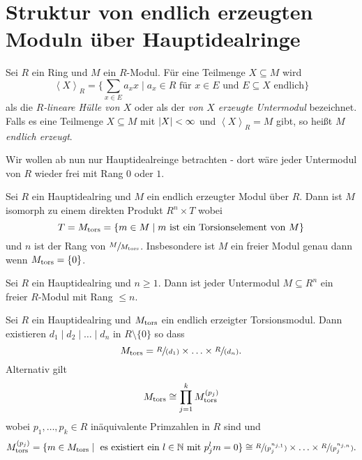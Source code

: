 \section{Struktur von endlich erzeugten Moduln über Hauptidealringe}

\begin{definition}
	Sei $R$ ein Ring und $M $ ein $R$-Modul.
	Für eine Teilmenge $X \subseteq M$ wird
	\[
	\left< X \right>_{R} = \{\sum_{x \in E} a_{x} x \mid a_{x} \in R \text{ für $x \in E$ und $E \subseteq X$ endlich}\} 
	\]
	als die \emph{$R$-lineare Hülle von $X$} oder als der \emph{von $X$ erzeugte Untermodul} bezeichnet.
	Falls es eine Teilmenge $X \subseteq M$ mit $\abs{X} < \infty$ und $\left< X \right>_{R} = M$ gibt, so heißt $M$ \emph{endlich erzeugt}.
\end{definition}


Wir wollen ab nun nur Hauptidealreinge betrachten - dort wäre jeder Untermodul von $R$ wieder frei mit Rang $0$ oder $1$.

\begin{theorem}
	Sei $R$ ein Hauptidealring und $M$ ein endlich erzeugter Modul über $R$.
	Dann ist $M$ isomorph zu einem direkten Produkt $R^{n} \times T$ wobei
	\[
		T = M_{\operatorname{tors}} = \{m \in M \mid m \text{ ist ein Torsionselement von } M\}
	\]
	und $n$ ist der Rang von $\sfrac{M}{M_{\operatorname{tors}}}$.
	Insbesondere ist $M$ ein freier Modul genau dann wenn $M_{\operatorname{tors}} = \{0\}$.
\end{theorem}

\begin{proposition}
	Sei $R$ ein Hauptidealring und $n \geq 1$. Dann ist jeder Untermodul $M \subseteq R^{n}$ ein freier $R$-Modul mit Rang $\leq n$.
\end{proposition}



\begin{theorem}
	Sei $R$ ein Hauptidealring und $M_{\operatorname{tors}}$ ein endlich erzeigter Torsionsmodul. 
	Dann existieren $d_1 \mid d_2 \mid \ldots \mid d_{n}$ in $R \setminus \{0\} $ so dass
	\[
		M_{\operatorname{tors}} = \sfrac{R}{(d_1)} \times \ldots \times \sfrac{R}{(d_{n})}
	.\] 
	Alternativ gilt
	\[
		M_{\operatorname{tors}} \cong \prod_{j=1}^{k} M_{\operatorname{tors}}^{(p_{j})}
	\]
	wobei $p_1,\ldots,p_{k} \in R$ inäquivalente Primzahlen in $R$ sind und %
	\[
		M_{\operatorname{tors}}^{(p_{j})} = \{m \in M_{\operatorname{tors}} \mid \text{ es existiert ein $l \in \mathbb{N}$ mit } p_{j}^{l} m = 0\} \cong 
		\sfrac{R}{(p_{j}^{n_{j,1}})} \times \ldots \times \sfrac{R}{(p_{j}^{n_{j,n}})}
	.\] 
\end{theorem}

